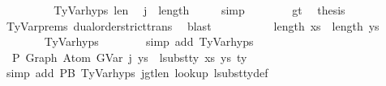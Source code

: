\begin{isabellebody}
\ {\isacharminus}{\kern0pt}\isanewline
\ \ \ \ \ \ \isamarkupfalse%
\ TyVar{\isachardot}{\kern0pt}hyps{\isacharparenleft}{\kern0pt}{}{\isacharparenright}{\kern0pt}\ len{\isacharunderscore}{\kern0pt}{\isasymGamma}{}\ \isamarkupfalse%
\ {\isachardoublequoteopen}j\ {\isacharless}{\kern0pt}\ length\ {\isasymGamma}{}\ {\isacharplus}{\kern0pt}\ {}{\isachardoublequoteclose}\ \isamarkupfalse%
\ simp\isanewline
\ \ \ \ \ \ \isamarkupfalse%
\ gt\ \isamarkupfalse%
\ {\isacharquery}{\kern0pt}thesis\isanewline
\ \ \ \ \ \ \isamarkupfalse%
\ TyVar{\isachardot}{\kern0pt}prems{\isacharparenleft}{\kern0pt}{}{\isacharparenright}{\kern0pt}\ dual{\isacharunderscore}{\kern0pt}order{\isachardot}{\kern0pt}strict{\isacharunderscore}{\kern0pt}trans{}\ \isamarkupfalse%
\ blast\isanewline
\ \ \ \ \isamarkupfalse%
\isanewline
\isanewline
\ \ \ \ \isamarkupfalse%
\ {\isachardoublequoteopen}length\ xs{\isacharprime}{\kern0pt}\ {\isacharequal}{\kern0pt}\ length\ ys{\isachardoublequoteclose}\isanewline
\ \ \ \ \ \ \isamarkupfalse%
\ TyVar{\isachardot}{\kern0pt}hyps{\isacharparenleft}{\kern0pt}{}{\isacharparenright}{\kern0pt}\isanewline
\ \ \ \ \ \ \isamarkupfalse%
\ {\isacharparenleft}{\kern0pt}simp\ add{\isacharcolon}{\kern0pt}\ TyVar{\isachardot}{\kern0pt}hyps{\isacharparenleft}{\kern0pt}{}{\isacharparenright}{\kern0pt}{\isacharparenright}{\kern0pt}\isanewline
\isanewline
\ \ \ \ \isamarkupfalse%
\ \isamarkupfalse%
\ {\isachardoublequoteopen}{\isasymGamma}{}\ {\isasymturnstile}{\isacharbraceleft}{\kern0pt}P{\isacharbraceright}{\kern0pt}\ Graph\ {\isacharparenleft}{\kern0pt}Atom\ {\isacharparenleft}{\kern0pt}GVar\ j{\isacharparenright}{\kern0pt}\ ys{\isacharparenright}{\kern0pt}\ {\isacharcolon}{\kern0pt}\ lsubst{\isacharunderscore}{\kern0pt}ty\ xs{\isacharprime}{\kern0pt}\ ys\ ty{\isacharprime}{\kern0pt}{\isachardoublequoteclose}\isanewline
\ \ \ \ \ \ \isamarkupfalse%
\ {\isacharparenleft}{\kern0pt}simp\ add{\isacharcolon}{\kern0pt}\ P{}B\ TyVar{\isachardot}{\kern0pt}hyps{\isacharparenleft}{\kern0pt}{}{\isacharcomma}{\kern0pt}{}{\isacharcomma}{\kern0pt}{}{\isacharparenright}{\kern0pt}\ j{\isacharunderscore}{\kern0pt}gt{\isacharunderscore}{\kern0pt}len{\isacharunderscore}{\kern0pt}{\isasymGamma}{}\ lookup{}\ lsubst{\isacharunderscore}{\kern0pt}ty{\isacharunderscore}{\kern0pt}def\isanewline

\end{isabellebody}
